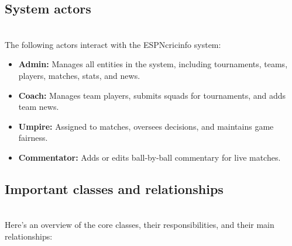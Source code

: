 \subsection{System actors}\label{tRr3rQ8-TRMNvOiLdJrct}
\\
The following actors interact with the ESPNcricinfo system:

\begin{itemize}
\item
\protect{}\label{SRu_ijNo_0yb5Ev1T4qIo}
\textbf{Admin:} Manages all entities in the system, including tournaments, teams, players, matches, stats, and news.
\item
\protect{}\label{Rtm8ggS-3hA5s2RuFEr3L}
\textbf{Coach:} Manages team players, submits squads for tournaments, and adds team news.
\item
\protect{}\label{mweuJsTtPSzPI1d1Gqmbg}
\textbf{Umpire:} Assigned to matches, oversees decisions, and maintains game fairness.
\item
\protect{}\label{jXutHmxcmsTYWtGaMfzTV}
\textbf{Commentator:} Adds or edits ball-by-ball commentary for live matches.
\end{itemize}

\subsection{Important classes and relationships}\label{8B4batc7tPnkLKimnsw-R}
\\
Here's an overview of the core classes, their responsibilities, and their main relationships:

